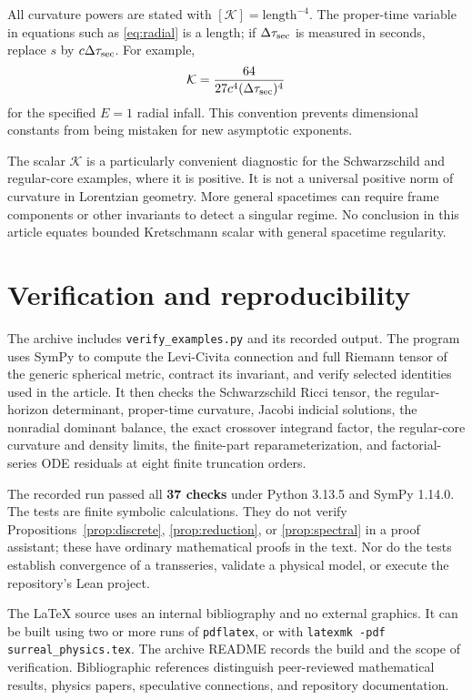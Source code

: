 \documentclass[11pt,letterpaper]{article}
\newcommand{\Kretsch}{\mathcal K}
\theoremstyle{definition}
\theoremstyle{remark}
\begin{document}
All curvature powers are stated with $[\Kretsch]=\text{length}^{-4}$. The
proper-time variable in equations such as \eqref{eq:radial} is a length;
if $\Delta\tau_{\rm sec}$ is measured in seconds, replace $s$ by
$c\Delta\tau_{\rm sec}$. For example,
\[
 \Kretsch=\frac{64}{27c^4(\Delta\tau_{\rm sec})^4}
\]
for the specified $E=1$ radial infall. This convention prevents dimensional
constants from being mistaken for new asymptotic exponents.

The scalar $\Kretsch$ is a particularly convenient diagnostic for the
Schwarzschild and regular-core examples, where it is positive. It is not a
universal positive norm of curvature in Lorentzian geometry. More general
spacetimes can require frame components or other invariants to detect a
singular regime. No conclusion in this article equates bounded Kretschmann
scalar with general spacetime regularity.

\section{Verification and reproducibility}
\label{app:verification}

The archive includes \texttt{verify\_examples.py} and its recorded output.
The program uses SymPy to compute the Levi-Civita connection and full Riemann
tensor of the generic spherical metric, contract its invariant, and verify
selected identities used in the article. It then checks the Schwarzschild
Ricci tensor, the regular-horizon determinant, proper-time curvature, Jacobi
indicial solutions, the nonradial dominant balance, the exact crossover
integrand factor, the regular-core curvature and density limits, the
finite-part reparameterization, and factorial-series ODE residuals at eight
finite truncation orders.

The recorded run passed all \textbf{37 checks} under Python 3.13.5 and
SymPy 1.14.0. The tests are finite symbolic calculations. They do not verify
Propositions~\ref{prop:discrete}, \ref{prop:reduction}, or
\ref{prop:spectral} in a proof assistant; these have ordinary mathematical
proofs in the text. Nor do the tests establish convergence of a transseries,
validate a physical model, or execute the repository's Lean project.

The LaTeX source uses an internal bibliography and no external graphics.
It can be built using two or more runs of \texttt{pdflatex}, or with
\texttt{latexmk -pdf surreal\_physics.tex}. The archive README records the
build and the scope of verification. Bibliographic references distinguish
peer-reviewed mathematical results, physics papers, speculative connections,
and repository documentation.
\end{document}
